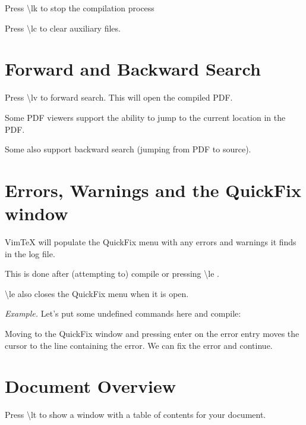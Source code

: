 \documentclass{article}
\newcommand{\lt}{\textbackslash{}lt }
\newcommand{\lk}{\textbackslash{}lk }
\newcommand{\lv}{\textbackslash{}lv }
\newcommand{\lc}{\textbackslash{}lc }
\renewcommand{\le}{\textbackslash{}le }
\begin{document}
Press \lk to stop the compilation process

Press \lc to clear auxiliary files.














\section{Forward and Backward Search}

Press \lv to forward search. This will open the compiled PDF.

Some PDF viewers support the ability to jump to the current location in the PDF.

Some also support backward search (jumping from PDF to source).
















\section{Errors, Warnings and the QuickFix window}

VimTeX will populate the QuickFix menu with any errors and warnings it finds in
the log file.

This is done after (attempting to) compile or pressing \le.

\le also closes the QuickFix menu when it is open.

\emph{Example.} Let's put some undefined commands here and compile:

Moving to the QuickFix window and pressing enter on the error entry moves the
cursor to the line containing the error. We can fix the error and continue.










\section{Document Overview}

Press \lt to show a window with a table of contents for your document.
\end{document}
